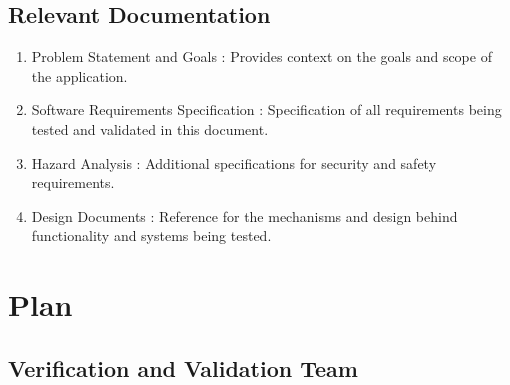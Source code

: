 \documentclass[12pt, titlepage]{article}
\begin{document}
\subsection{Relevant Documentation}

\begin{enumerate}
  \item Problem Statement and Goals \citep{ProblemStatement}:
    Provides context on the goals and scope of the application.
  \item Software Requirements Specification :
    Specification of all requirements being tested and validated in
    this document.
  \item Hazard Analysis : Additional
    specifications for security and safety requirements.
  \item Design Documents : Reference for the
    mechanisms and design behind functionality and systems being tested.
\end{enumerate}

\section{Plan}


\subsection{Verification and Validation Team}
\end{document}
